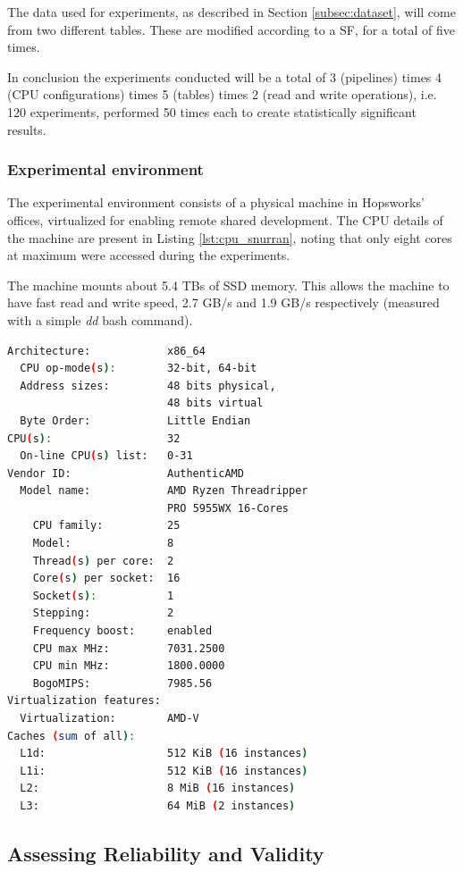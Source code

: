 The data used for experiments, as described in Section \ref{subsec:dataset}, will come from two different tables. These are modified according to a \gls{SF}, for a total of five times.

In conclusion the experiments conducted will be a total of 3 (pipelines) times 4 (\gls{CPU} configurations) times 5 (tables) times 2 (read and write operations), i.e. 120 experiments, performed 50 times each to create statistically significant results.

\subsubsection*{Experimental environment}
The experimental environment consists of a physical machine in Hopsworks' offices, virtualized for enabling remote shared development. The \gls{CPU} details of the machine are present in Listing \ref{lst:cpu_snurran}, noting that only eight cores at maximum were accessed during the experiments.

The machine mounts about 5.4 TBs of \gls{SSD} memory. This allows the machine to have fast read and write speed, 2.7 GB/s and 1.9 GB/s respectively (measured with a simple \textit{dd} bash command).

\begin{lstlisting}[language=bash, caption={Output of a \textit{lscpu} bash command on the test environment.}, label={lst:cpu_snurran}, frame=tb]
Architecture:            x86_64
  CPU op-mode(s):        32-bit, 64-bit
  Address sizes:         48 bits physical, 
                         48 bits virtual
  Byte Order:            Little Endian
CPU(s):                  32
  On-line CPU(s) list:   0-31
Vendor ID:               AuthenticAMD
  Model name:            AMD Ryzen Threadripper 
                         PRO 5955WX 16-Cores
    CPU family:          25
    Model:               8
    Thread(s) per core:  2
    Core(s) per socket:  16
    Socket(s):           1
    Stepping:            2
    Frequency boost:     enabled
    CPU max MHz:         7031.2500
    CPU min MHz:         1800.0000
    BogoMIPS:            7985.56
Virtualization features: 
  Virtualization:        AMD-V
Caches (sum of all):     
  L1d:                   512 KiB (16 instances)
  L1i:                   512 KiB (16 instances)
  L2:                    8 MiB (16 instances)
  L3:                    64 MiB (2 instances)
\end{lstlisting}
\FloatBarrier

\subsection{Assessing Reliability and Validity}

